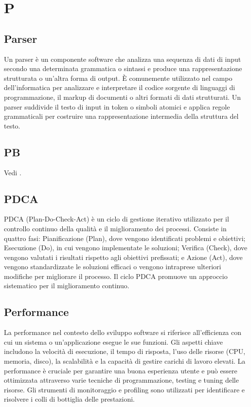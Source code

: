 \section{P}

\vspace{2em}
\subsection*{Parser}
Un parser è un componente software che analizza una sequenza di dati di input secondo una determinata grammatica o sintassi e produce una rappresentazione strutturata o un'altra forma di output. È comunemente utilizzato nel campo dell'informatica per analizzare e interpretare il codice sorgente di linguaggi di programmazione, il markup di documenti o altri formati di dati strutturati. Un parser suddivide il testo di input in token o simboli atomici e applica regole grammaticali per costruire una rappresentazione intermedia della struttura del testo.

\vspace{2em}
\subsection*{PB}
\par Vedi .

\vspace{2em}
\subsection*{PDCA}
PDCA (Plan-Do-Check-Act) è un ciclo di gestione iterativo utilizzato per il controllo continuo della qualità e il miglioramento dei processi. Consiste in quattro fasi: Pianificazione (Plan), dove vengono identificati problemi e obiettivi; Esecuzione (Do), in cui vengono implementate le soluzioni; Verifica (Check), dove vengono valutati i risultati rispetto agli obiettivi prefissati; e Azione (Act), dove vengono standardizzate le soluzioni efficaci o vengono intraprese ulteriori modifiche per migliorare il processo. Il ciclo PDCA promuove un approccio sistematico per il miglioramento continuo.

\vspace{2em}
\subsection*{Performance}
La performance nel contesto dello sviluppo software si riferisce all'efficienza con cui un sistema o un'applicazione esegue le sue funzioni. Gli aspetti chiave includono la velocità di esecuzione, il tempo di risposta, l'uso delle risorse (CPU, memoria, disco), la scalabilità e la capacità di gestire carichi di lavoro elevati. La performance è cruciale per garantire una buona esperienza utente e può essere ottimizzata attraverso varie tecniche di programmazione, testing e tuning delle risorse. Gli strumenti di monitoraggio e profiling sono utilizzati per identificare e risolvere i colli di bottiglia delle prestazioni.


